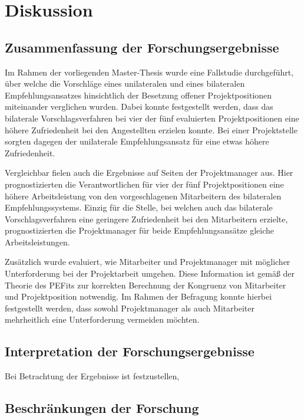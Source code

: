 \chapter{Diskussion}
\label{ch:diskussion}

\section{Zusammenfassung der Forschungsergebnisse}
\label{ch:diskussion:zusammenfassung}
Im Rahmen der vorliegenden Master-Thesis wurde eine Fallstudie durchgeführt, über welche die Vorschläge eines unilateralen und eines bilateralen Empfehlungsansatzes hinsichtlich der Besetzung offener Projektpositionen miteinander verglichen wurden. Dabei konnte festgestellt werden, dass das bilaterale Vorschlagsverfahren bei vier der fünf evaluierten Projektpositionen eine höhere Zufriedenheit bei den Angestellten erzielen konnte. Bei einer Projektstelle sorgten dagegen der unilaterale Empfehlungsansatz für eine etwas höhere Zufriedenheit.

Vergleichbar fielen auch die Ergebnisse auf Seiten der Projektmanager aus. Hier prognostizierten die Verantwortlichen für vier der fünf Projektpositionen eine höhere Arbeitsleistung von den vorgeschlagenen Mitarbeitern des bilateralen Empfehlungssystems. Einzig für die Stelle, bei welchen auch das bilaterale Vorschlagsverfahren eine geringere Zufriedenheit bei den Mitarbeitern erzielte, prognostizierten die Projektmanager für beide Empfehlungsansätze gleiche Arbeitsleistungen.

Zusätzlich wurde evaluiert, wie Mitarbeiter und Projektmanager mit möglicher Unterforderung bei der Projektarbeit umgehen. Diese Information ist gemäß der Theorie des \acp{PEFit} zur korrekten Berechnung der Kongruenz von Mitarbeiter und Projektposition notwendig. Im Rahmen der Befragung konnte hierbei festgestellt werden, dass sowohl Projektmanager als auch Mitarbeiter mehrheitlich eine Unterforderung vermeiden möchten.

\newpage
\section{Interpretation der Forschungsergebnisse}
\label{ch:diskussion:interpretation}
Bei Betrachtung der Ergebnisse ist festzustellen, 

\section{Beschränkungen der Forschung}
\label{ch:diskussion:beschraenkungen}

